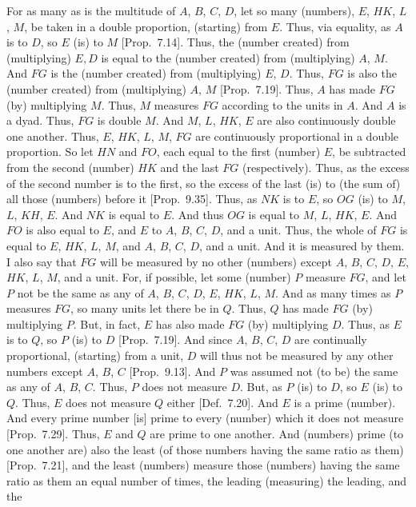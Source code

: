 \begin{Parallel}{}{}
{For as many as is the multitude of $A$, $B$, $C$, $D$, let so many (numbers), $E$, $HK$, $L$, $M$, be taken in a double
proportion, (starting) from $E$. Thus, via equality, as $A$ is to $D$, so
$E$ (is) to $M$ [Prop.~7.14].
Thus, the (number created) from (multiplying) $E, D$ is equal to the (number
created) from (multiplying) $A$, $M$.
 And $FG$ is the
(number created) from (multiplying) $E$, $D$. Thus, $FG$ is also
the (number created) from (multiplying) $A$, $M$ [Prop.~7.19]. Thus, $A$ has made $FG$ (by) multiplying $M$. Thus, $M$ measures $FG$ according to the units in $A$.
And $A$ is a dyad. Thus, $FG$ is double $M$.  And $M$, $L$, $HK$,
$E$ are also continuously double one another. Thus, $E$, $HK$, $L$, $M$,
$FG$ are continuously proportional in a double proportion. So
let $HN$ and $FO$, each equal to the first (number) $E$, be subtracted from the second (number) $HK$ and the last $FG$ (respectively). 
Thus, as the excess of the second number is to the first, so the excess
of the last (is) to (the sum of) all  those (numbers) before it [Prop.~9.35]. Thus, as $NK$ is to $E$, so
$OG$ (is) to $M$, $L$, $KH$, $E$. And $NK$ is equal to $E$. And thus
$OG$ is equal to $M$, $L$, $HK$, $E$. And $FO$ is also equal to $E$,
and $E$ to $A$, $B$, $C$, $D$, and a unit. Thus, the whole of $FG$ is equal to
$E$, $HK$, $L$, $M$, and $A$, $B$, $C$, $D$, and a unit. And it is
measured by them. I also say that $FG$ will be measured by no other (numbers)
except $A$, $B$, $C$, $D$, $E$, $HK$, $L$, $M$, and a unit. For, if possible, let some (number) $P$ measure $FG$, and let $P$ not be the same
as any of $A$, $B$, $C$, $D$, $E$, $HK$, $L$, $M$. And as many times
as $P$ measures $FG$, so many units let there be in $Q$. Thus, $Q$ has
made $FG$ (by) multiplying $P$. But, in fact, $E$ has  also made $FG$
(by) multiplying $D$. Thus, as $E$ is to $Q$, so $P$ (is) to $D$
[Prop.~7.19]. And since $A$, $B$, $C$, $D$
are continually proportional, (starting) from a unit, $D$ will thus not be measured
by any other numbers except $A$, $B$, $C$ [Prop.~9.13]. And $P$ was assumed not (to be) the same as any of $A$, $B$, $C$. Thus, $P$ does not measure $D$. But, as $P$ (is) to
$D$, so $E$ (is) to $Q$. Thus, $E$ does not measure $Q$ either
 [Def.~7.20]. And $E$ is a prime (number).
And every prime number [is] prime to every  (number) which it does not
measure [Prop.~7.29]. Thus, $E$ and $Q$ are
prime to one another. And  (numbers) prime (to one another are) also the least (of those
numbers having the same ratio as them) [Prop.~7.21],
and the least (numbers) measure those (numbers) having the same ratio as them an equal number of times, the leading (measuring) the leading, and the
}
\end{Parallel}
